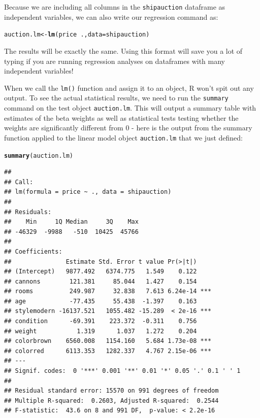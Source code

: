 \documentclass{tufte-book}\usepackage[]{graphicx}\usepackage[]{color}
\makeatletter
\newcommand{\hlopt}[1]{\textcolor[rgb]{0,0,0}{#1}}%
\newcommand{\hlstd}[1]{\textcolor[rgb]{0.345,0.345,0.345}{#1}}%
\newcommand{\hlkwb}[1]{\textcolor[rgb]{0.69,0.353,0.396}{#1}}%
\newcommand{\hlkwc}[1]{\textcolor[rgb]{0.333,0.667,0.333}{#1}}%
\newcommand{\hlkwd}[1]{\textcolor[rgb]{0.737,0.353,0.396}{\textbf{#1}}}%
\newenvironment{kframe}{%
 \def\at@end@of@kframe{}%
 \ifinner\ifhmode%
  \def\at@end@of@kframe{\end{minipage}}%
  \begin{minipage}{\columnwidth}%
 \fi\fi%
 \def\FrameCommand##1{\hskip\@totalleftmargin \hskip-\fboxsep
 \colorbox{shadecolor}{##1}\hskip-\fboxsep
     \hskip-\linewidth \hskip-\@totalleftmargin \hskip\columnwidth}%
 \MakeFramed {\advance\hsize-\width
   \@totalleftmargin\z@ \linewidth\hsize
   \@setminipage}}%
 {\par\unskip\endMakeFramed%
 \at@end@of@kframe}
\newenvironment{knitrout}{}{} %
\makeatother
\begin{document}
\begin{footnotesize}
\begin{marginfigure}

Because we are including all columns in the \texttt{shipauction} dataframe as independent variables, we can also write our regression command as:

\begin{knitrout}
\color{fgcolor}\begin{kframe}
\begin{alltt}
\hlstd{auction.lm} \hlkwb{<-} \hlkwd{lm}\hlstd{(price} \hlopt{~} \hlstd{.,} \hlkwc{data} \hlstd{= shipauction)}
\end{alltt}
\end{kframe}
\end{knitrout}

The results will be exactly the same. Using this format will save you a lot of typing if you are running regression analyses on dataframes with many independent variables!

\end{marginfigure}

When we call the \texttt{lm()} function and assign it to an object, R won't spit out any output. To see the actual statistical results, we need to run the \texttt{summary} command on the test object \texttt{auction.lm}. This will output a summary table with estimates of the beta weights as well as statistical tests testing whether the weights are significantly different from 0 - here is the output from the summary function applied to the linear model object \texttt{auction.lm} that we just defined:

\begin{knitrout}
\color{fgcolor}\begin{kframe}
\begin{alltt}
\hlkwd{summary}\hlstd{(auction.lm)}
\end{alltt}
\begin{verbatim}
## 
## Call:
## lm(formula = price ~ ., data = shipauction)
## 
## Residuals:
##    Min     1Q Median     3Q    Max 
## -46329  -9988   -510  10425  45766 
## 
## Coefficients:
##               Estimate Std. Error t value Pr(>|t|)    
## (Intercept)   9877.492   6374.775   1.549    0.122    
## cannons        121.381     85.044   1.427    0.154    
## rooms          249.987     32.838   7.613 6.24e-14 ***
## age            -77.435     55.438  -1.397    0.163    
## stylemodern -16137.521   1055.482 -15.289  < 2e-16 ***
## condition      -69.391    223.372  -0.311    0.756    
## weight           1.319      1.037   1.272    0.204    
## colorbrown    6560.008   1154.160   5.684 1.73e-08 ***
## colorred      6113.353   1282.337   4.767 2.15e-06 ***
## ---
## Signif. codes:  0 '***' 0.001 '**' 0.01 '*' 0.05 '.' 0.1 ' ' 1
## 
## Residual standard error: 15570 on 991 degrees of freedom
## Multiple R-squared:  0.2603,	Adjusted R-squared:  0.2544 
## F-statistic:  43.6 on 8 and 991 DF,  p-value: < 2.2e-16
\end{verbatim}
\end{kframe}
\end{knitrout}


\end{footnotesize}
\end{document}
